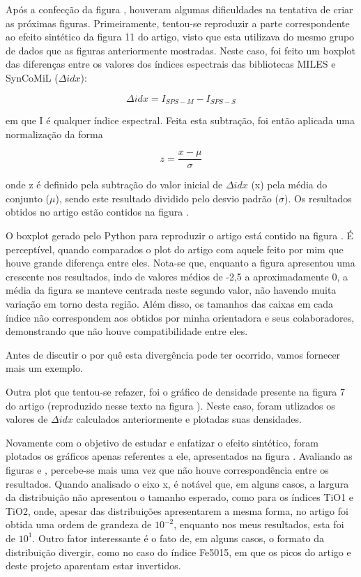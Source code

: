\documentclass[12pt]{projeto}
\begin{document}
Após a confecção da figura , houveram algumas dificuldades na tentativa de criar as próximas figuras. Primeiramente, tentou-se reproduzir a parte correspondente ao efeito sintético da figura 11 do artigo, visto que esta utilizava do mesmo grupo de dados que as figuras anteriormente mostradas. Neste caso, foi feito um boxplot das diferenças entre os valores dos índices espectrais das bibliotecas MILES e SynCoMiL (\(\Delta idx\)):

\[\Delta idx = I_{SPS-M} - I_{SPS-S}\]

em que I é qualquer índice espectral. Feita esta subtração, foi então aplicada uma normalização da forma

\[z = \frac{x-\mu}{\sigma}\]

onde z é definido pela subtração do valor inicial de \(\Delta idx\) (x) pela média do conjunto (\(\mu\)), sendo este resultado dividido pelo desvio padrão (\(\sigma\)). Os resultados obtidos no artigo estão contidos na figura .

O boxplot gerado pelo Python para reproduzir o artigo está contido na figura .
É perceptível, quando comparados o plot do artigo com aquele feito por mim que houve grande diferença entre eles. Nota-se que, enquanto a figura  apresentou uma crescente nos resultados, indo de valores médios de -2,5 a aproximadamente 0, a média da figura  se manteve centrada neste segundo valor, não havendo muita variação em torno desta região. Além disso, os tamanhos das caixas em cada índice não correspondem aos obtidos por minha orientadora e seus colaboradores, demonstrando que não houve compatibilidade entre eles.

Antes de discutir o por quê esta divergência pode ter ocorrido, vamos fornecer mais um exemplo.

Outra plot que tentou-se refazer, foi o gráfico de densidade presente na figura 7 do artigo (reproduzido nesse texto na figura ). Neste caso, foram utlizados os valores de \(\Delta idx\) calculados anteriormente e plotadas suas densidades.

Novamente com o objetivo de estudar e enfatizar o efeito sintético, foram plotados os gráficos apenas referentes a ele, apresentados na figura .
Avaliando as figuras e , percebe-se mais uma vez que não houve correspondência entre os resultados. Quando analisado o eixo x, é notável que, em alguns casos, a largura da distribuição não apresentou o tamanho esperado, como para os índices TiO1 e TiO2, onde, apesar das distribuições apresentarem a mesma forma, no artigo foi obtida uma ordem de grandeza de \(10^{-2}\), enquanto nos meus resultados, esta foi de \(10^1\). Outro fator interessante é o fato de, em alguns casos, o formato da distribuição divergir, como no caso do índice Fe5015, em que os picos do artigo e deste projeto aparentam estar invertidos. 
\end{document}
